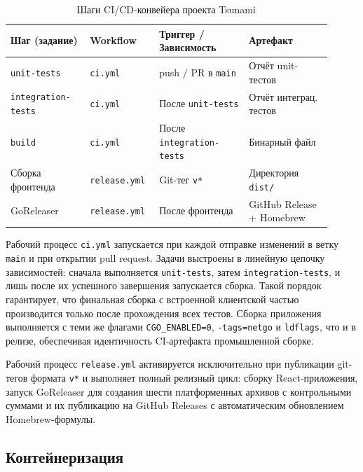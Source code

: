 \begin{table}[h!]
  \centering
  \caption{Шаги CI/CD-конвейера проекта Tsunami}
  \label{tab:ch2-cicd}
  \small
  \begin{tabular}{|>{\raggedright\arraybackslash}p{0.23\linewidth}|>{\raggedright\arraybackslash}p{0.18\linewidth}|>{\raggedright\arraybackslash}p{0.26\linewidth}|>{\raggedright\arraybackslash}p{0.24\linewidth}|}
    \hline
    \textbf{Шаг (задание)} & \textbf{Workflow} & \textbf{Триггер / Зависимость} & \textbf{Артефакт} \\
    \hline
    \texttt{unit-tests} & \texttt{ci.yml} & push / PR в \texttt{main} & Отчёт unit-тестов \\
    \hline
    \texttt{integration-tests} & \texttt{ci.yml} & После \texttt{unit-tests} & Отчёт интеграц. тестов \\
    \hline
    \texttt{build} & \texttt{ci.yml} & После \texttt{integration-tests} & Бинарный файл \\
    \hline
    Сборка фронтенда & \texttt{release.yml} & Git-тег \texttt{v*} & Директория \texttt{dist/} \\
    \hline
    GoReleaser & \texttt{release.yml} & После фронтенда & GitHub Release + Homebrew \\
    \hline
  \end{tabular}
\end{table}

Рабочий процесс \texttt{ci.yml} запускается при каждой отправке изменений в ветку \texttt{main} и при открытии pull request.
Задачи выстроены в линейную цепочку зависимостей: сначала выполняется \texttt{unit-tests}, затем \texttt{integration-tests}, и лишь после их успешного завершения запускается сборка.
Такой порядок гарантирует, что финальная сборка с встроенной клиентской частью производится только после прохождения всех тестов.
Сборка приложения выполняется с теми же флагами \texttt{CGO\_ENABLED=0}, \texttt{-tags=netgo} и \texttt{ldflags}, что и в релизе, обеспечивая идентичность CI-артефакта промышленной сборке.

Рабочий процесс \texttt{release.yml} активируется исключительно при публикации git-тегов формата \texttt{v*} и выполняет полный релизный цикл: сборку React-приложения, запуск GoReleaser для создания шести платформенных архивов с контрольными суммами и их публикацию на GitHub Releases с автоматическим обновлением Homebrew-формулы.

\subsection*{Контейнеризация}

